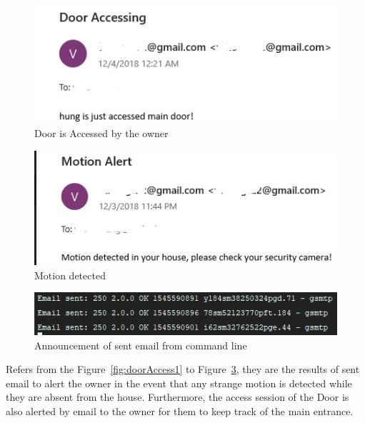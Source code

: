 \begin{figure}[!htb]
    \begin{center}
    \includegraphics[scale=0.8]{images/doorAccess2.jpg}
    \caption{Door is Accessed by the owner}
    \label{fig:doorAccess2}
    \end{center}
\end{figure}
\begin{figure}[!htb]
    \begin{center}
    \includegraphics[scale=0.8]{images/emailAlert.jpg}
    \caption{Motion detected}
    \label{fig:emailAlert}
    \end{center}
\end{figure}
\begin{figure}[!htb]
    \begin{center}
    \includegraphics[scale=0.8]{images/emailSent.png}
    \caption{Announcement of sent email from command line}
    \label{fig:emailSent}
    \end{center}
\end{figure}

Refers from the Figure~\ref{fig:doorAccess1} to Figure~\ref{fig:emailSent}, they are the results of sent email to alert the owner in the event that any strange motion is detected while they are absent from the house. Furthermore, the access session of the Door is also alerted by email to the owner for them to keep track of the main entrance.

